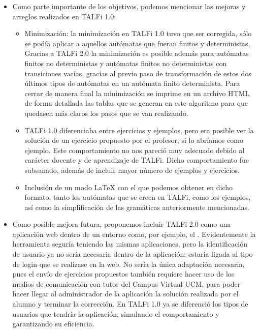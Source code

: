 \documentclass[12pt,a4paper,spanish]{book}
\begin{document}
\begin{itemize}
\item Como parte importante de los objetivos, podemos mencionar las mejoras y arreglos realizados en TALFi 1.0:
\begin{itemize}
\item Minimizaci\'on: la minimizaci\'on en TALFi 1.0 tuvo que ser corregida, s\'olo se pod\'ia aplicar a aquellos aut\'omatas que fueran finitos y deterministas. Gracias a TALFi 2.0 la minimizaci\'on es posible adem\'as para aut\'omatas finitos no deterministas y aut\'omatas finitos no deterministas con transiciones vac\'ias, gracias al previo paso de transformaci\'on de estos dos \'ultimos tipos de aut\'omatas en un aut\'omata finito determinista.
Para cerrar de manera final la minimizaci\'on se imprime en un archivo HTML de forma detallada las tablas que se generan en este algoritmo para que quedasen m\'as claros los pasos que se van realizando.
\item TALFi 1.0 diferenciaba entre ejercicios y ejemplos, pero era posible ver la soluci\'on de un ejercicio propuesto por el profesor, si lo abr\'iamos como ejemplo. Este comportamiento no nos pareci\'o muy adecuado debido al car\'acter docente y de aprendizaje de TALFi. Dicho comportamiento fue subsanado, adem\'as de incluir mayor n\'umero de ejemplos y ejercicios.
\item Inclusi\'on de un modo \LaTeX{} con el que podemos obtener en dicho formato, tanto los aut\'omatas que se creen en TALFi, como los ejemplos, as\'i como la simplificaci\'on de las gram\'aticas anteriormente mencionadas.\\
\end{itemize}
\item Como posible mejora futura, proponemos incluir TALFi 2.0 como una aplicaci\'on web dentro de un entorno como, por ejemplo, el . Evidentemente la herramienta segur\'ia teniendo las mismas aplicaciones, pero la identificaci\'on de usuario ya no ser\'ia necesaria dentro de la aplicaci\'on: estar\'ia ligada al tipo de login que se realizase en la web.
No ser\'ia la \'unica adaptaci\'on necesaria, pues el env\'io de ejercicios propuestos tambi\'en requiere hacer uso de los medios de comunicaci\'on con tutor del Campus Virtual UCM, para poder hacer llegar al administrador de la aplicaci\'on la soluci\'on realizada por el alumno y terminar la correcci\'on.
En TALFi 1.0 ya se diferenci\'o los tipos de usuarios que tendr\'ia la aplicaci\'on, simulando el comportamiento y garantizando su eficiencia.
\end{itemize}
\end{document}
